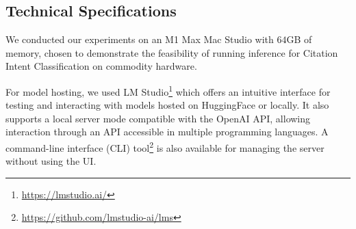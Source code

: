 
\subsection{Technical Specifications}\label{sec:technical_specifications}

We conducted our experiments on an M1 Max Mac Studio with $64$GB of memory, chosen to demonstrate the feasibility of running inference for Citation Intent Classification on commodity hardware.

For model hosting, 
we used LM Studio\footnote{\url{https://lmstudio.ai/}} which offers an intuitive interface for testing and interacting with models hosted on HuggingFace or locally. 
It also supports a local server mode compatible with the OpenAI API, allowing interaction through an API accessible in multiple programming languages. 
A command-line interface (CLI) tool\footnote{\url{https://github.com/lmstudio-ai/lms}} is also available for managing the server without using the UI.


